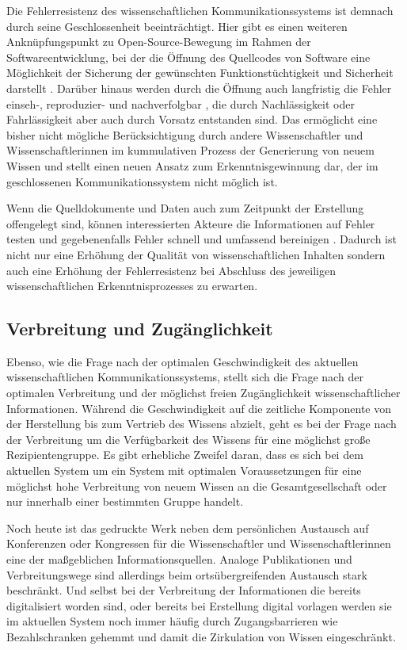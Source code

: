 Die Fehlerresistenz des wissenschaftlichen Kommunikationssystems ist demnach durch seine Geschlossenheit beeinträchtigt. Hier gibt es einen weiteren Anknüpfungspunkt zu Open-Source-Bewegung im Rahmen der Softwareentwicklung, bei der die Öffnung des Quellcodes von Software eine Möglichkeit der Sicherung der gewünschten Funktionstüchtigkeit und Sicherheit darstellt \cite[:7]{Hoepman_2007}. Darüber hinaus werden durch die Öffnung auch langfristig die Fehler einseh-, reproduzier- und nachverfolgbar \cite{Nosek_2015}, die durch Nachlässigkeit oder Fahrlässigkeit aber auch durch Vorsatz entstanden sind. Das ermöglicht eine bisher nicht mögliche Berücksichtigung durch andere Wissenschaftler und Wissenschaftlerinnen im kummulativen Prozess der Generierung von neuem Wissen und stellt einen neuen Ansatz zum Erkenntnisgewinnung dar, der im geschlossenen Kommunikationssystem nicht möglich ist.

Wenn die Quelldokumente und Daten auch zum Zeitpunkt der Erstellung offengelegt sind, können interessierten Akteure die Informationen auf Fehler testen und gegebenenfalls Fehler schnell und umfassend bereinigen \cite[:10]{Gruber_2005} \cite{Curry_2015}. Dadurch ist nicht nur eine Erhöhung der Qualität von wissenschaftlichen Inhalten sondern auch eine Erhöhung der Fehlerresistenz bei Abschluss des jeweiligen wissenschaftlichen Erkenntnisprozesses zu erwarten.

\subsection{Verbreitung und Zugänglichkeit}

Ebenso, wie die Frage nach der optimalen Geschwindigkeit des aktuellen wissenschaftlichen Kommunikationssystems, stellt sich die Frage nach der optimalen Verbreitung und der möglichst freien Zugänglichkeit \cite[:10]{Gruber_2005} wissenschaftlicher Informationen. Während die Geschwindigkeit auf die zeitliche Komponente von der Herstellung bis zum Vertrieb des Wissens abzielt, geht es bei der Frage nach der Verbreitung um die Verfügbarkeit des Wissens für eine möglichst große Rezipientengruppe. Es gibt erhebliche Zweifel daran, dass es sich bei dem aktuellen System um ein System mit optimalen Voraussetzungen für eine möglichst hohe Verbreitung von neuem Wissen an die Gesamtgesellschaft \cite{Curry_2015} oder nur innerhalb einer bestimmten Gruppe handelt.

Noch heute ist das gedruckte Werk neben dem persönlichen Austausch auf Konferenzen oder Kongressen \cite{Winkler_2011} für die Wissenschaftler und Wissenschaftlerinnen eine der maßgeblichen Informationsquellen. Analoge Publikationen und Verbreitungswege sind allerdings beim ortsübergreifenden Austausch stark beschränkt. Und selbst bei der Verbreitung der Informationen die bereits digitalisiert worden sind, oder bereits bei Erstellung digital vorlagen werden sie im aktuellen System noch immer häufig durch Zugangsbarrieren wie Bezahlschranken gehemmt und damit die Zirkulation von Wissen eingeschränkt.

